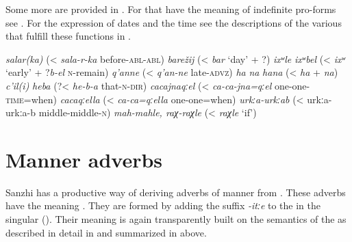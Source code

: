 Some more  are provided in . For  that have the meaning of indefinite pro-forms see . For the expression of dates and the time see the descriptions of the various  that fulfill these functions in .
%
\begin{exe}
	\ex	\label{ex:adjectivesWithSalarka}
	\begin{xlist}
		\TabPositions{14em}
		\ex \textit{salar(ka)} 	(< \textit{sala-r-ka} before-\textsc{abl-abl}) 
		\ex	\textit{barežij}  (< \textit{bar} `day' + ?)
		\ex \textit{ixʷle} 		
		\ex \textit{ixʷbel}  (< \textit{ixʷ} `early' + ?\textit{b-el} \textsc{n}-remain)
		\ex	\textit{q'anne}  (< \textit{q'an-ne} late-\textsc{advz})
		\ex	\textit{ha}  
		\ex	\textit{na}  
		\ex \textit{hana} 	(< \textit{ha} + \textit{na})
		\ex \textit{c'il(i)} 		
		\ex \textit{heba}  (?< \textit{he-b-a} that-\textsc{n-dir})
		\ex \textit{cacajnaqːel}  (< \textit{ca-ca-jna=qːel} one-one-\textsc{time}=when)
		\ex \textit{cacaqːella}  (< \textit{ca-ca=qːella} one-one=when)
		\ex \textit{urkːa-urkːab}  (< urkːa-urkːa-b middle-middle-\textsc{n})
		\ex \textit{mah-mahle, raχ-raχle}  (< \textit{raχle} `if')
		\end{xlist}
\end{exe}



\section{Manner adverbs}
\label{sec:MannerAdverbs}

Sanzhi has a productive way of deriving adverbs of manner from . These adverbs have the meaning . They are formed by adding the suffix \textit{-itːe} to the  in the singular (). Their meaning is again transparently built on the semantics of the  as described in detail in  and summarized in  above.



